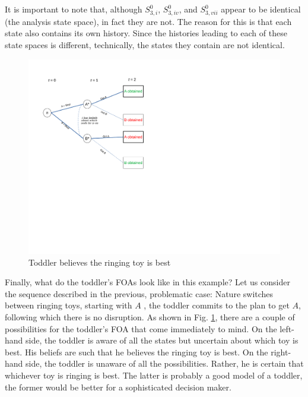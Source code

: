 \documentclass[
11pt,
titlepage,
reqno,
]{article}%
\theoremstyle{definition}
\begin{document}
It is important to note that, although $S^0_{3,i}$, $S^0_{3,iv}$, and $S^0_{3,vii}$ appear to be identical (the analysis state space), in fact they are not. The reason for this is that each state also contains its own history. Since the histories leading to each of these state spaces is different, technically, the states they contain are not identical.



\begin{figure}[h!]
	\centering
	\includegraphics*[page=18,trim = 0in 5in 1.5in 0in,scale=.7]{Awareness_Diagrams_All}
	\caption{Toddler believes the ringing toy is best\label{Diag: p-18}}%
\end{figure}

Finally, what do the toddler's FOAs look like in this example? Let us consider the sequence described in the previous, problematic case: Nature switches between ringing toys, starting with $A$ , the toddler commits to the plan to get $A$, following which there is no disruption. As shown in Fig. \ref{Diag: p-18}, there are a couple of possibilities for the toddler's FOA that come immediately to mind. On the left-hand side, the toddler is aware of all the states but uncertain about which toy is best. His beliefs are such that he believes the ringing toy is best. On the right-hand side, the toddler is unaware of all the possibilities. Rather, he is certain that whichever toy is ringing is best. The latter is probably a good model of a toddler, the former would be better for a sophisticated decision maker.
\end{document}
